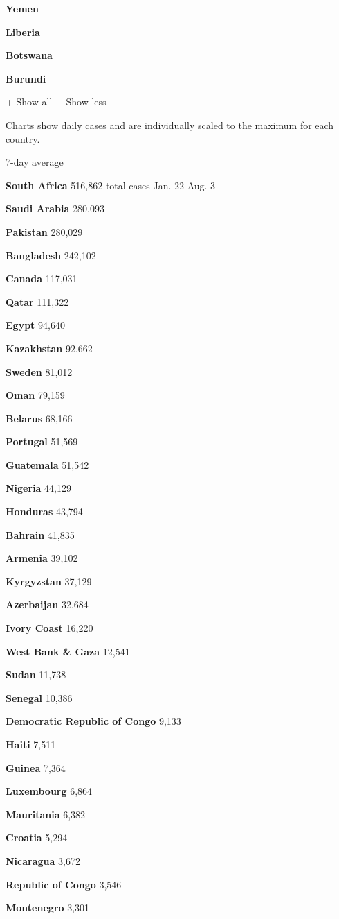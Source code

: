\textbf{Yemen}

\textbf{Liberia}

\textbf{Botswana}

\textbf{Burundi}

+ Show all + Show less

Charts show daily cases and are individually scaled to the maximum for
each country.

7-day average

\textbf{South Africa} 516,862 total cases Jan. 22 Aug. 3

\textbf{Saudi Arabia} 280,093

\textbf{Pakistan} 280,029

\textbf{Bangladesh} 242,102

\textbf{Canada} 117,031

\textbf{Qatar} 111,322

\textbf{Egypt} 94,640

\textbf{Kazakhstan} 92,662

\textbf{Sweden} 81,012

\textbf{Oman} 79,159

\textbf{Belarus} 68,166

\textbf{Portugal} 51,569

\textbf{Guatemala} 51,542

\textbf{Nigeria} 44,129

\textbf{Honduras} 43,794

\textbf{Bahrain} 41,835

\textbf{Armenia} 39,102

\textbf{Kyrgyzstan} 37,129

\textbf{Azerbaijan} 32,684

\textbf{Ivory Coast} 16,220

\textbf{West Bank \& Gaza} 12,541

\textbf{Sudan} 11,738

\textbf{Senegal} 10,386

\textbf{Democratic Republic of Congo} 9,133

\textbf{Haiti} 7,511

\textbf{Guinea} 7,364

\textbf{Luxembourg} 6,864

\textbf{Mauritania} 6,382

\textbf{Croatia} 5,294

\textbf{Nicaragua} 3,672

\textbf{Republic of Congo} 3,546

\textbf{Montenegro} 3,301

